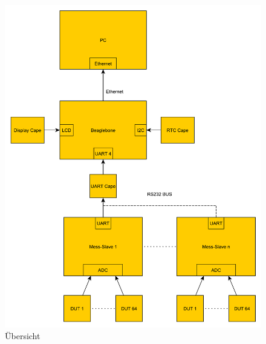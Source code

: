 \begin{figure}[H]
\begin{center}
\includegraphics[width=\textwidth ]{img/general/BlockPlan.pdf}
\caption{Übersicht}
\label{figure_Übersicht}
\end{center}
\end{figure}






\newpage


